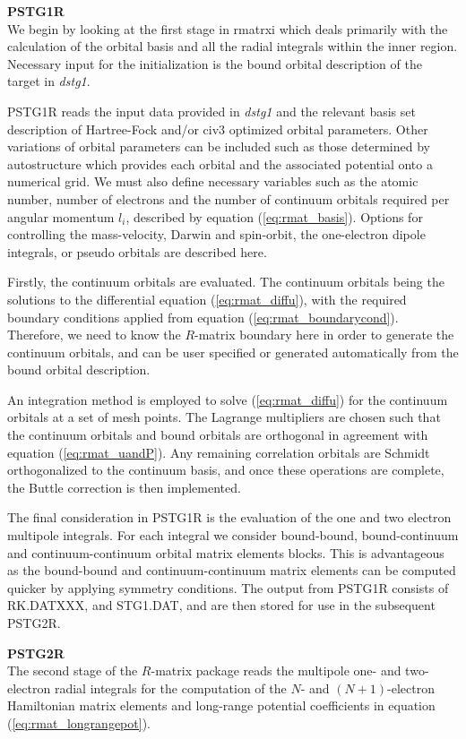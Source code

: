 \protect\textbf{PSTG1R}\\
We begin by looking at the first stage in {\sc rmatrxi} which deals primarily with the calculation of the orbital basis and all the radial integrals within the inner region. Necessary input for the initialization is the bound orbital description of the target in \textit{dstg1}.

PSTG1R reads the input data provided in \textit{dstg1} and the relevant basis set description of Hartree-Fock and/or {\sc civ3} optimized orbital parameters. Other variations of orbital parameters can be included such as those determined by {\sc autostructure} which provides each orbital and the associated potential onto a numerical grid. We must also define necessary variables such as the atomic number, number of electrons and the number of continuum orbitals required per angular momentum $l_i$, described by equation (\ref{eq:rmat_basis}). Options for controlling the mass-velocity, Darwin and spin-orbit, the one-electron dipole integrals, or pseudo orbitals are described here. 

Firstly, the continuum orbitals are evaluated. The continuum orbitals being the solutions to the differential equation (\ref{eq:rmat_diffu}), with the required boundary conditions applied from equation (\ref{eq:rmat_boundarycond}). Therefore, we need to know the $R$-matrix boundary here in order to generate the continuum orbitals, and can be user specified or generated automatically from the bound orbital description.

An integration method is employed to solve (\ref{eq:rmat_diffu}) for the continuum orbitals at a set of mesh points. The Lagrange multipliers are chosen such that the continuum orbitals and bound orbitals are orthogonal in agreement with equation (\ref{eq:rmat_uandP}). Any remaining correlation orbitals are Schmidt orthogonalized to the continuum basis, and once these operations are complete, the Buttle correction is then implemented.

The final consideration in PSTG1R is the evaluation of the one and two electron multipole integrals. For each integral we consider bound-bound, bound-continuum and continuum-continuum orbital matrix elements blocks. This is advantageous as the bound-bound and continuum-continuum matrix elements can be computed quicker by applying symmetry conditions. The output from PSTG1R consists of RK.DATXXX, and STG1.DAT, and are then stored for use in the subsequent PSTG2R.

\protect\textbf{PSTG2R}\\
The second stage of the $R$-matrix package reads the multipole one- and two-electron radial integrals for the computation of the $N$- and $(N+1)$-electron Hamiltonian matrix elements and long-range potential coefficients in equation (\ref{eq:rmat_longrangepot}). 

